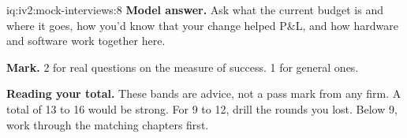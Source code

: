 \begin{solution}{iq:iv2:mock-interviews:8}
\ivstop
\textbf{Model answer.} Ask what the current budget is and where it goes, how you'd know that your change helped P\&L, and how hardware and software work together here.

\textbf{Mark.} 2 for real questions on the measure of success. 1 for general ones.

\medskip
\textbf{Reading your total.} These bands are advice, not a pass mark from any firm. A total of 13 to 16 would be strong. For 9 to 12, drill the rounds you lost. Below 9, work through the matching chapters first.

\end{solution}

